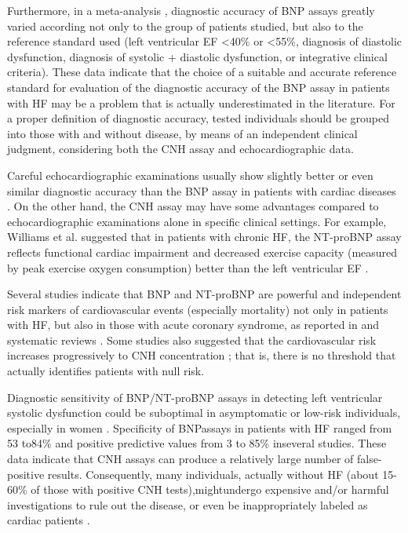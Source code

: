 \documentclass[14pt,a4paper,onecolumn]{extarticle}
\begin{document}
Furthermore, in a meta-analysis \citep{bib372}, diagnostic accuracy of BNP assays greatly varied according not only to the group of patients studied, but also to the reference standard used (left ventricular EF <40\% or <55\%, diagnosis of diastolic dysfunction, diagnosis of systolic + diastolic dysfunction, or integrative clinical criteria). These data indicate that the choice of a suitable and accurate reference standard for evaluation of the diagnostic accuracy of the BNP assay in patients with HF may be a problem that is actually underestimated in the literature. For a proper definition of diagnostic accuracy, tested individuals should be grouped into those with and without disease, by means of an independent clinical judgment, considering both the CNH assay and echocardiographic data.

Careful echocardiographic examinations usually show slightly better or even similar diagnostic accuracy than the BNP assay in patients with cardiac diseases \citep{bib373} \citep{bib3178}. On the other hand, the CNH assay may have some advantages compared to echocardiographic examinations alone in specific clinical settings. For example, Williams et al. suggested that in patients with chronic HF, the NT-proBNP assay reflects functional cardiac impairment and decreased exercise capacity (measured by peak exercise oxygen consumption) better than the left ventricular EF \citep{bib375}.

Several studies indicate that BNP and NT-proBNP are powerful and independent risk markers of cardiovascular events (especially mortality) not only in patients with HF, but also in those with acute coronary syndrome, as reported in  and systematic reviews \citep{bib35} \citep{bib376} \citep{bib377} \citep{bib378}. Some studies also suggested that the cardiovascular risk increases progressively to CNH concentration \citep{bib377} \citep{bib378} \citep{bib3194}; that is, there is no threshold that actually identifies patients with null risk.


Diagnostic sensitivity of BNP/NT-proBNP assays in detecting left ventricular systolic dysfunction could be suboptimal in asymptomatic or low-risk individuals, especially in women \citep{bib39}. Specificity of BNPassays in patients with HF ranged from 53 to84\% and positive predictive values from 3 to 85\% inseveral studies. These data indicate that CNH assays can produce a relatively large number of false-positive results. Consequently, many individuals, actually without HF (about 15-60\% of those with positive CNH tests),mightundergo expensive and/or harmful investigations to rule out the disease, or even be inappropriately labeled as cardiac patients \citep{bib35}.
\end{document}
